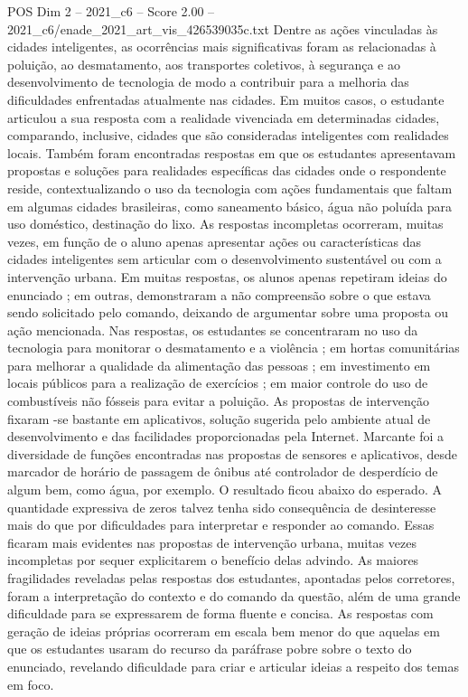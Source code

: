 \begin{textsample}{POS Dim 2 – 2021\_c6 – Score 2.00 – 2021\_c6/enade\_2021\_art\_vis\_426539035c.txt}
Dentre as ações vinculadas às cidades inteligentes, as ocorrências mais significativas foram as relacionadas à poluição, ao desmatamento, aos transportes coletivos, à segurança e ao desenvolvimento de tecnologia de modo a contribuir para a melhoria das dificuldades enfrentadas atualmente nas cidades.
Em muitos casos, o estudante articulou a sua resposta com a realidade vivenciada em determinadas cidades, comparando, inclusive, cidades que são consideradas inteligentes com realidades locais.
Também foram encontradas respostas em que os estudantes apresentavam propostas e soluções para realidades específicas das cidades onde o respondente reside, contextualizando o uso da tecnologia com ações fundamentais que faltam em algumas cidades brasileiras, como saneamento básico, água não poluída para uso doméstico, destinação do lixo.
As respostas incompletas ocorreram, muitas vezes, em função de o aluno apenas apresentar ações ou características das cidades inteligentes sem articular com o desenvolvimento sustentável ou com a intervenção urbana.
Em muitas respostas, os alunos apenas repetiram ideias do enunciado ; em outras, demonstraram a não compreensão sobre o que estava sendo solicitado pelo comando, deixando de argumentar sobre uma proposta ou ação mencionada.
Nas respostas, os estudantes se concentraram no uso da tecnologia para monitorar o desmatamento e a violência ; em hortas comunitárias para melhorar a qualidade da alimentação das pessoas ; em investimento em locais públicos para a realização de exercícios ; em maior controle do uso de combustíveis não fósseis para evitar a poluição.
As propostas de intervenção fixaram -se bastante em aplicativos, solução sugerida pelo ambiente atual de desenvolvimento e das facilidades proporcionadas pela Internet.
Marcante foi a diversidade de funções encontradas nas propostas de sensores e aplicativos, desde marcador de horário de passagem de ônibus até controlador de desperdício de algum bem, como água, por exemplo.
O resultado ficou abaixo do esperado.
A quantidade expressiva de zeros talvez tenha sido consequência de desinteresse mais do que por dificuldades para interpretar e responder ao comando.
Essas ficaram mais evidentes nas propostas de intervenção urbana, muitas vezes incompletas por sequer explicitarem o benefício delas advindo.
As maiores fragilidades reveladas pelas respostas dos estudantes, apontadas pelos corretores, foram a interpretação do contexto e do comando da questão, além de uma grande dificuldade para se expressarem de forma fluente e concisa.
As respostas com geração de ideias próprias ocorreram em escala bem menor do que aquelas em que os estudantes usaram do recurso da paráfrase pobre sobre o texto do enunciado, revelando dificuldade para criar e articular ideias a respeito dos temas em foco.

\end{textsample}
